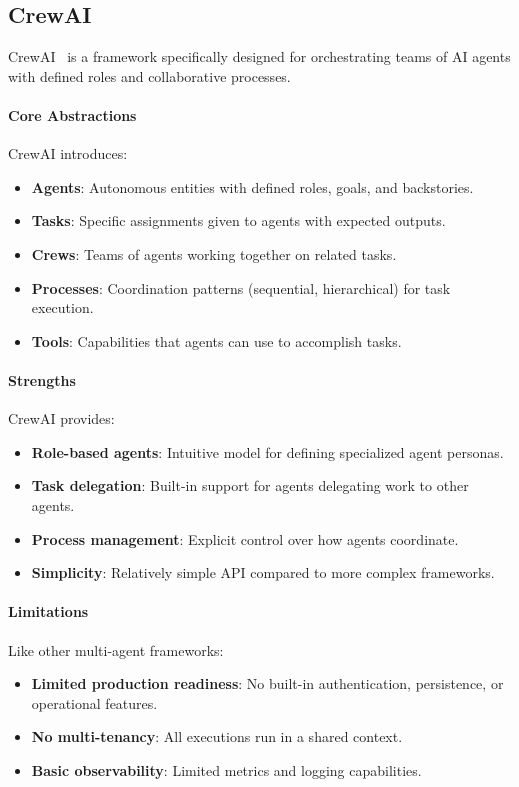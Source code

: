 \documentclass[a4paper,twoside]{sapthesis}
\begin{document}
\subsection{CrewAI}

CrewAI~\cite{crewai2024}
is a framework specifically designed for orchestrating teams of AI agents with defined roles and collaborative processes.

\paragraph{Core Abstractions}
CrewAI introduces:
\begin{itemize}
    \item \textbf{Agents}: Autonomous entities with defined roles, goals, and backstories.
    \item \textbf{Tasks}: Specific assignments given to agents with expected outputs.
    \item \textbf{Crews}: Teams of agents working together on related tasks.
    \item \textbf{Processes}: Coordination patterns (sequential, hierarchical) for task execution.
    \item \textbf{Tools}: Capabilities that agents can use to accomplish tasks.
\end{itemize}

\paragraph{Strengths}
CrewAI provides:
\begin{itemize}
    \item \textbf{Role-based agents}: Intuitive model for defining specialized agent personas.
    \item \textbf{Task delegation}: Built-in support for agents delegating work to other agents.
    \item \textbf{Process management}: Explicit control over how agents coordinate.
    \item \textbf{Simplicity}: Relatively simple API compared to more complex frameworks.
\end{itemize}

\paragraph{Limitations}
Like other multi-agent frameworks:
\begin{itemize}
    \item \textbf{Limited production readiness}: No built-in authentication, persistence, or operational features.
    \item \textbf{No multi-tenancy}: All executions run in a shared context.
    \item \textbf{Basic observability}: Limited metrics and logging capabilities.
\end{itemize}
\end{document}
